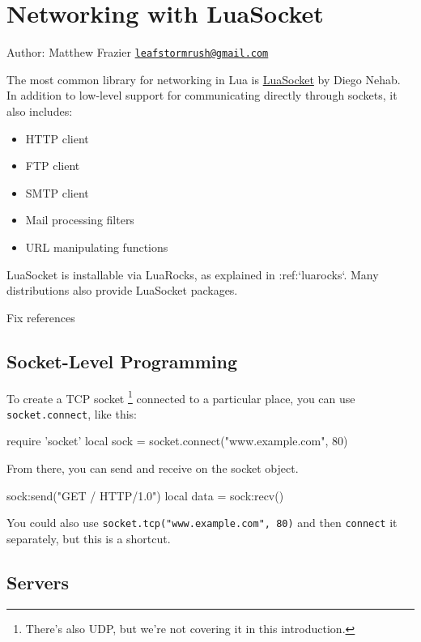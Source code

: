 \section{Networking with LuaSocket}

Author: Matthew Frazier
\href{mailto:leafstormrush@gmail.com}{\texttt{leafstormrush@gmail.com}}

The most common library for networking in Lua is
\href{http://w3.impa.br/~diego/software/luasocket/}{LuaSocket} by
Diego Nehab. In addition to low-level support for communicating
directly through sockets, it also includes:

\begin{itemize}
\item
  HTTP client
\item
  FTP client
\item
  SMTP client
\item
  Mail processing filters
\item
  URL manipulating functions
\end{itemize}
LuaSocket is installable via LuaRocks, as explained in
:ref:`luarocks`. Many distributions also provide LuaSocket
packages.

\begin{TODO}Fix references\end{TODO}

\subsection{Socket-Level Programming}

To create a TCP socket%
\footnote{There's also UDP, but we're not covering it in this introduction.}
connected to a particular place, you can use \verb!socket.connect!,
like this:

\begin{LUA}
require 'socket'
local sock = socket.connect("www.example.com", 80)
\end{LUA}

From there, you can send and receive on the socket object.

\begin{LUA}
sock:send("GET / HTTP/1.0\n\n")
local data = sock:recv()
\end{LUA}

You could also use \verb!socket.tcp("www.example.com", 80)! and
then \verb!connect! it separately, but this is a shortcut.

\subsection{Servers}

